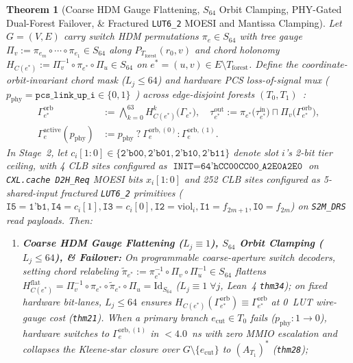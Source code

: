 \documentclass[11pt,letterpaper]{article}
\theoremstyle{spectralthm}
\newtheorem{theorem}{Theorem}[section]
\begin{document}
\begin{theorem}[Coarse HDM Gauge Flattening, $S_{64}$ Orbit Clamping, PHY-Gated Dual-Forest Failover, \& Fractured \texttt{LUT6\_2} MOESI and Mantissa Clamping]
\label{thm:sheaf_moesi}
Let $G = (V, E)$ carry switch HDM permutations $\pi_e \in S_{64}$ with tree gauge $\Pi_v := \pi_{e_m} \circ \cdots \circ \pi_{e_1} \in S_{64}$ along $P_{T_{\mathrm{forest}}}(r_0, v)$ and chord holonomy $H_{C(e^*)} := \Pi_v^{-1} \circ \pi_{e^*} \circ \Pi_u \in S_{64}$ on $e^* = (u,v) \in E \setminus T_{\mathrm{forest}}$. Define the coordinate-orbit-invariant chord mask ($L_j \le 64$) and hardware PCS loss-of-signal mux ($p_{\mathrm{phy}} = \texttt{pcs\_link\_up\_i} \in \{0,1\}$~\cite{ucie2025spec30}) across edge-disjoint forests $(T_0, T_1)$~\cite{tutte1961problem, nashwilliams1961edge}:
\begin{equation}
\label{eq:holonomy_orbit}
\begin{aligned}
\Gamma_{e^*}^{\mathrm{orb}} &:= \bigwedge_{k=0}^{63} H_{C(e^*)}^k\bigl(\Gamma_{e^*}\bigr),\quad
\tau_{e^*}^{\mathrm{out}} := \pi_{e^*}\bigl(\tau_{e^*}^{\mathrm{in}}\bigr) \sqcap \Pi_v\bigl(\Gamma_{e^*}^{\mathrm{orb}}\bigr),\\
\Gamma_e^{\mathrm{active}}(p_{\mathrm{phy}}) &:= p_{\mathrm{phy}}\ ?\ \Gamma_e^{\mathrm{orb},(0)} : \Gamma_e^{\mathrm{orb},(1)}.
\end{aligned}
\end{equation}
In Stage~2, let $c_i[1:0] \in \{\texttt{2'b00},\texttt{2'b01},\texttt{2'b10},\texttt{2'b11}\}$ denote slot $i$'s 2-bit tier ceiling, with 4 CLB sites configured as $\texttt{INIT} = \texttt{64'hCC00CC00\_A2E0A2E0}$ on \texttt{CXL.cache D2H\_Req} MOESI bits $x_i[1:0]$ and 252 CLB sites configured as 5-shared-input fractured \mbox{\texttt{LUT6\_2}} primitives ($\texttt{I5}=\texttt{1'b1}, \texttt{I4}=c_i[1], \texttt{I3}=c_i[0], \texttt{I2}=\mathrm{viol}_i, \texttt{I1}=f_{2m+1}, \texttt{I0}=f_{2m}$) on \texttt{S2M\_DRS} read payloads. Then:
\begin{enumerate}
  \item[(i)] \textbf{Coarse HDM Gauge Flattening ($L_j \equiv 1$), $S_{64}$ Orbit Clamping ($L_j \le 64$), \& Failover:} On programmable coarse-aperture switch decoders, setting chord relabeling $\widetilde{\pi}_{e^*} := \pi_{e^*}^{-1} \circ \Pi_v \circ \Pi_u^{-1} \in S_{64}$ flattens $H_{C(e^*)}^{\mathrm{flat}} = \Pi_v^{-1} \circ \pi_{e^*} \circ \widetilde{\pi}_{e^*} \circ \Pi_u = \mathrm{Id}_{S_{64}}$ ($L_j \equiv 1\;\forall j$, Lean~4 \texttt{thm34}); on fixed hardware bit-lanes, $L_j \le 64$ ensures $H_{C(e^*)}(\Gamma_{e^*}^{\mathrm{orb}}) \equiv \Gamma_{e^*}^{\mathrm{orb}}$ at 0~LUT wire-gauge cost (\texttt{thm21}). When a primary branch $e_{\mathrm{cut}} \in T_0$ fails ($p_{\mathrm{phy}} : 1 \rightarrow 0$), hardware switches to $\Gamma_e^{\mathrm{orb},(1)}$ in $< 4.0$~ns with zero MMIO escalation and collapses the Kleene-star closure over $G \setminus \{e_{\mathrm{cut}}\}$ to $(A_{T_1})^*$ (\texttt{thm28});

\end{enumerate}
\end{theorem}
\end{document}
